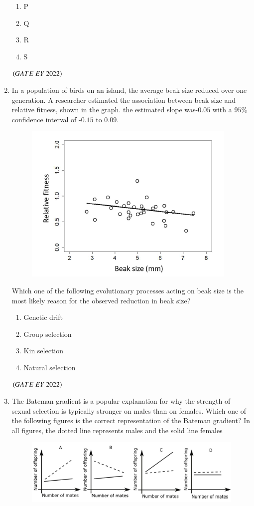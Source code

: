 \documentclass[journal]{IEEEtran}
\numberwithin{equation}{enumi}
\numberwithin{figure}{enumi}
\begin{document}
\begin{enumerate}
    \begin{enumerate}
        \item  P
        \item  Q
        \item  R
        \item  S
    \end{enumerate}
    \hfill{$\brak{ GATE\ EY\ 2022}$}
    \bigskip
 \item In a population of birds on an island, the average beak size reduced over one
generation. A researcher estimated the association between beak size and relative fitness, shown in the graph. the estimated slope was-$0.05$ with a $95$\% confidence interval of -$0.15$ to $0.09$.

\begin{figure}[H]
    \centering
\includegraphics[width=0.5\columnwidth]{figs/10.png}
    \caption{}
    \label{fig:10}
   \end{figure}
Which one of the following evolutionary processes acting on beak size is the most
likely reason for the observed reduction in beak size?
    \begin{enumerate}
        \item  Genetic drift
        \item  Group selection
        \item  Kin selection
        \item  Natural selection
    \end{enumerate}
    \hfill{$\brak{ GATE\ EY\ 2022}$}
    \bigskip
  \item The Bateman gradient is a popular explanation for why the strength of sexual selection
is typically stronger on males than on females. Which one of the following figures is
the correct representation of the Bateman gradient? In all figures, the dotted line
represents males and the solid line females
\begin{figure}[H]
    \centering
\includegraphics[width=0.5\columnwidth]{figs/11.png}

\end{figure}
\end{enumerate}
\end{document}
